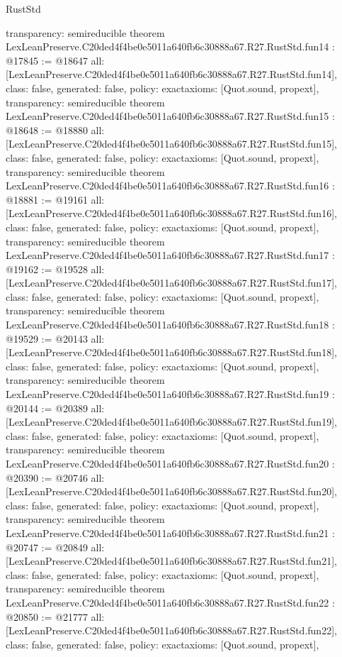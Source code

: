 \begin{lexlean}{RustStd}
\begin{coremodule}
{  transparency: semireducible
}
theorem LexLeanPreserve.C20ded4f4be0e5011a640fb6c30888a67.R27.RustStd.fun14 : @17845 := @18647 {
  all: [LexLeanPreserve.C20ded4f4be0e5011a640fb6c30888a67.R27.RustStd.fun14],
  class: false,
  generated: false,
  policy: exact{axioms: [Quot.sound, propext]},
  transparency: semireducible
}
theorem LexLeanPreserve.C20ded4f4be0e5011a640fb6c30888a67.R27.RustStd.fun15 : @18648 := @18880 {
  all: [LexLeanPreserve.C20ded4f4be0e5011a640fb6c30888a67.R27.RustStd.fun15],
  class: false,
  generated: false,
  policy: exact{axioms: [Quot.sound, propext]},
  transparency: semireducible
}
theorem LexLeanPreserve.C20ded4f4be0e5011a640fb6c30888a67.R27.RustStd.fun16 : @18881 := @19161 {
  all: [LexLeanPreserve.C20ded4f4be0e5011a640fb6c30888a67.R27.RustStd.fun16],
  class: false,
  generated: false,
  policy: exact{axioms: [Quot.sound, propext]},
  transparency: semireducible
}
theorem LexLeanPreserve.C20ded4f4be0e5011a640fb6c30888a67.R27.RustStd.fun17 : @19162 := @19528 {
  all: [LexLeanPreserve.C20ded4f4be0e5011a640fb6c30888a67.R27.RustStd.fun17],
  class: false,
  generated: false,
  policy: exact{axioms: [Quot.sound, propext]},
  transparency: semireducible
}
theorem LexLeanPreserve.C20ded4f4be0e5011a640fb6c30888a67.R27.RustStd.fun18 : @19529 := @20143 {
  all: [LexLeanPreserve.C20ded4f4be0e5011a640fb6c30888a67.R27.RustStd.fun18],
  class: false,
  generated: false,
  policy: exact{axioms: [Quot.sound, propext]},
  transparency: semireducible
}
theorem LexLeanPreserve.C20ded4f4be0e5011a640fb6c30888a67.R27.RustStd.fun19 : @20144 := @20389 {
  all: [LexLeanPreserve.C20ded4f4be0e5011a640fb6c30888a67.R27.RustStd.fun19],
  class: false,
  generated: false,
  policy: exact{axioms: [Quot.sound, propext]},
  transparency: semireducible
}
theorem LexLeanPreserve.C20ded4f4be0e5011a640fb6c30888a67.R27.RustStd.fun20 : @20390 := @20746 {
  all: [LexLeanPreserve.C20ded4f4be0e5011a640fb6c30888a67.R27.RustStd.fun20],
  class: false,
  generated: false,
  policy: exact{axioms: [Quot.sound, propext]},
  transparency: semireducible
}
theorem LexLeanPreserve.C20ded4f4be0e5011a640fb6c30888a67.R27.RustStd.fun21 : @20747 := @20849 {
  all: [LexLeanPreserve.C20ded4f4be0e5011a640fb6c30888a67.R27.RustStd.fun21],
  class: false,
  generated: false,
  policy: exact{axioms: [Quot.sound, propext]},
  transparency: semireducible
}
theorem LexLeanPreserve.C20ded4f4be0e5011a640fb6c30888a67.R27.RustStd.fun22 : @20850 := @21777 {
  all: [LexLeanPreserve.C20ded4f4be0e5011a640fb6c30888a67.R27.RustStd.fun22],
  class: false,
  generated: false,
  policy: exact{axioms: [Quot.sound, propext]},
}
\end{coremodule}
\end{lexlean}
